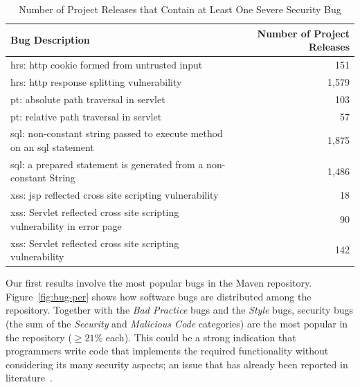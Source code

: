 \documentclass{sig-alternate}
\begin{document}
\begin{table}[t]
\centering
\caption{Number of Project Releases that Contain at Least One Severe Security Bug}
\label{tbl:sev}
\leavevmode
	\begin{tabular}{p{31em} r}
	\hline
	Bug Description & Number of Project Releases\\
 	\hline
	{\sc hrs}: {\sc http} cookie formed from untrusted input & 151\\
	{\sc hrs}: {\sc http} response splitting vulnerability & 1,579\\
	{\sc pt}: absolute path traversal in servlet  & 103\\
	{\sc pt}: relative path traversal in servlet & 57\\
	{\sc sql}: non-constant string passed to execute method on an {\sc sql} statement & 1,875\\
	{\sc sql}: a prepared statement is generated from a non-constant String & 1,486\\
	{\sc xss}: {\sc jsp} reflected cross site scripting vulnerability & 18\\
	{\sc xss}: Servlet reflected cross site scripting vulnerability in error page & 90\\
	{\sc xss}: Servlet reflected cross site scripting vulnerability & 142\\
	\hline
	\end{tabular}
\end{table}

Our first results involve the most popular bugs in the Maven repository.
Figure~\ref{fig:bug-per} shows how software bugs are distributed among the
repository. Together with the {\it Bad Practice} bugs and the {\it Style} bugs,
security bugs (the sum of the {\it Security} and {\it Malicious Code}
categories) are the most popular in the repository ($\geq 21\%$ each).
This could be a strong indication that programmers write code
that implements the required functionality without considering its many
security aspects; an issue that has already been reported in
literature~\cite{SH09}.
\end{document}
